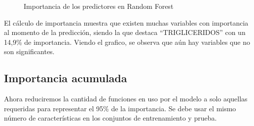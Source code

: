     \begin{center}
    	\begin{figure}[htb]
	\centering
	\caption{Importancia de los predictores en Random Forest}
	\label{fig:ip}
	\end{figure}
\end{center}

    
    El cálculo de importancia muestra que existen muchas variables con
importancia al momento de la predicción, siendo la que destaca
``TRIGLICERIDOS'' con un 14,9\% de importancia. Viendo el grafico, se
observa que aún hay variables que no son significantes.

    \hypertarget{importancia-acumulada}{%
\subsection{Importancia acumulada}\label{importancia-acumulada}}

Ahora reduciremos la cantidad de funciones en uso por el modelo a solo
aquellas requeridas para representar el 95\% de la importancia. Se debe
usar el mismo número de características en los conjuntos de
entrenamiento y prueba.

